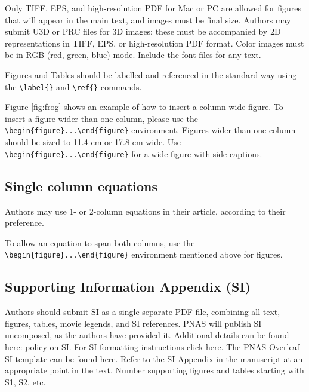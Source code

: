 \documentclass[9pt,twoside,lineno]{pnas-new}
\begin{document}
Only TIFF, EPS, and high-resolution PDF for Mac or PC are allowed for figures that will appear in the main text, and images must be final size. Authors may submit U3D or PRC files for 3D images; these must be accompanied by 2D representations in TIFF, EPS, or high-resolution PDF format.  Color images must be in RGB (red, green, blue) mode. Include the font files for any text. 

Figures and Tables should be labelled and referenced in the standard way using the \verb|\label{}| and \verb|\ref{}| commands.

Figure \ref{fig:frog} shows an example of how to insert a column-wide figure. To insert a figure wider than one column, please use the \verb|\begin{figure}...\end{figure}| environment. Figures wider than one column should be sized to 11.4 cm or 17.8 cm wide. Use \verb|\begin{figure}...\end{figure}| for a wide figure with side captions.


\subsection*{Single column equations}

Authors may use 1- or 2-column equations in their article, according to their preference.

To allow an equation to span both columns, use the \verb|\begin{figure}...\end{figure}| environment mentioned above for figures.



\subsection*{Supporting Information Appendix (SI)}

Authors should submit SI as a single separate PDF file, combining all text, figures, tables, movie legends, and SI references.  PNAS will publish SI uncomposed, as the authors have provided it.  Additional details can be found here: \href{https://www.pnas.org/page/authors/submission}{policy on SI}.  For SI formatting instructions click \href{https://www.pnascentral.org/cgi-bin/main.plex?form_type=display_auth_si_instructions}{here}.  The PNAS Overleaf SI template can be found \href{https://www.overleaf.com/latex/templates/pnas-template-for-supplementary-information/wqfsfqwyjtsd}{here}.  Refer to the SI Appendix in the manuscript at an appropriate point in the text. Number supporting figures and tables starting with S1, S2, etc.
\end{document}

